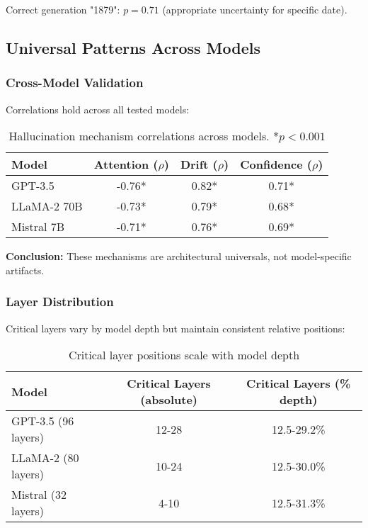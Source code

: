 \documentclass[11pt]{article}
\begin{document}
Correct generation "1879": $p = 0.71$ (appropriate uncertainty for specific date).

\subsection{Universal Patterns Across Models}

\subsubsection{Cross-Model Validation}

Correlations hold across all tested models:

\begin{table}[H]
\centering
\begin{tabular}{@{}lccc@{}}
\toprule
\textbf{Model} & \textbf{Attention ($\rho$)} & \textbf{Drift ($\rho$)} & \textbf{Confidence ($\rho$)} \\ \midrule
GPT-3.5 & -0.76* & 0.82* & 0.71* \\
LLaMA-2 70B & -0.73* & 0.79* & 0.68* \\
Mistral 7B & -0.71* & 0.76* & 0.69* \\ \bottomrule
\end{tabular}
\caption{Hallucination mechanism correlations across models. *$p < 0.001$}
\end{table}

\textbf{Conclusion:} These mechanisms are architectural universals, not model-specific artifacts.

\subsubsection{Layer Distribution}

Critical layers vary by model depth but maintain consistent relative positions:

\begin{table}[H]
\centering
\begin{tabular}{@{}lcc@{}}
\toprule
\textbf{Model} & \textbf{Critical Layers (absolute)} & \textbf{Critical Layers (\% depth)} \\ \midrule
GPT-3.5 (96 layers) & 12-28 & 12.5-29.2\% \\
LLaMA-2 (80 layers) & 10-24 & 12.5-30.0\% \\
Mistral (32 layers) & 4-10 & 12.5-31.3\% \\ \bottomrule
\end{tabular}
\caption{Critical layer positions scale with model depth}
\end{table}
\end{document}
